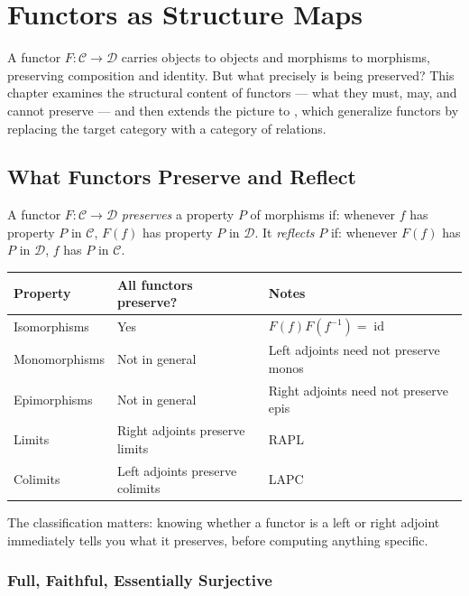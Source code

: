 
\chapter{Functors as Structure Maps}

A functor $F : \mathcal{C} \to \mathcal{D}$ carries objects to objects and
morphisms to morphisms, preserving composition and identity. But what precisely
is being preserved? This chapter examines the structural content of functors —
what they must, may, and cannot preserve — and then extends the picture to
, which generalize functors by replacing the target category
with a category of relations.

\section{What Functors Preserve and Reflect}

A functor $F : \mathcal{C} \to \mathcal{D}$ \emph{preserves} a property $P$ of
morphisms if: whenever $f$ has property $P$ in $\mathcal{C}$, $F(f)$ has property
$P$ in $\mathcal{D}$. It \emph{reflects} $P$ if: whenever $F(f)$ has $P$ in
$\mathcal{D}$, $f$ has $P$ in $\mathcal{C}$.

\begin{center}
\renewcommand{\arraystretch}{1.4}
\begin{tabular}{lll}
\hline
\textbf{Property} & \textbf{All functors preserve?} & \textbf{Notes} \\
\hline
Isomorphisms & Yes & $F(f)F(f^{-1}) = \operatorname{id}$ \\
Monomorphisms & Not in general & Left adjoints need not preserve monos \\
Epimorphisms & Not in general & Right adjoints need not preserve epis \\
Limits & Right adjoints preserve limits & RAPL \\
Colimits & Left adjoints preserve colimits & LAPC \\
\hline
\end{tabular}
\end{center}

The classification matters: knowing whether a functor is a left or right adjoint
immediately tells you what it preserves, before computing anything specific.

\subsection{Full, Faithful, Essentially Surjective}


